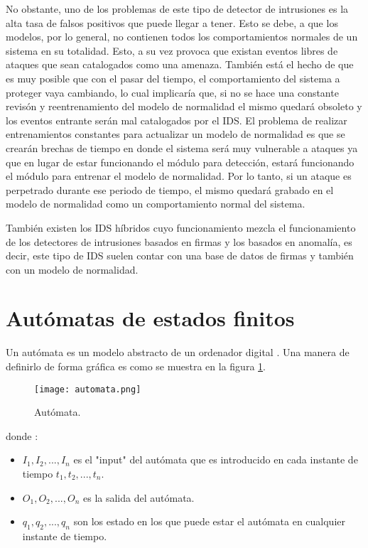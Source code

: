 No obstante, uno de los problemas de este tipo de detector de intrusiones es la alta tasa de falsos positivos que puede llegar a tener. Esto se debe, a que los modelos, por lo general, no contienen todos los comportamientos normales de un sistema en su totalidad. Esto, a su vez provoca que existan eventos libres de ataques que sean catalogados como una amenaza. Tambi\'en está el hecho de que es muy posible que con el pasar del tiempo, el comportamiento del sistema a proteger vaya cambiando, lo cual implicar\'ia que, si no se hace una constante revis\'on y reentrenamiento del modelo de normalidad el mismo quedar\'a obsoleto y los eventos entrante ser\'an mal catalogados por el IDS. El problema de realizar entrenamientos constantes para actualizar un modelo de normalidad es que se crearán brechas de tiempo en donde el sistema ser\'a muy vulnerable a ataques ya que en lugar de estar funcionando el módulo para detección, estar\'a funcionando el módulo para entrenar el modelo de normalidad. Por lo tanto, si un ataque es perpetrado durante ese periodo de tiempo, el mismo quedar\'a grabado en el modelo de normalidad como un comportamiento normal del sistema.

También existen los IDS híbridos cuyo funcionamiento mezcla el funcionamiento de los detectores de intrusiones basados en firmas y los basados en anomalía, es decir, este tipo de  IDS suelen contar con una base de datos de firmas y también con un modelo de normalidad.

\section{Autómatas de estados finitos}

Un autómata es un modelo abstracto de un ordenador digital \cite{automata}. Una manera de definirlo de forma gráfica es como se muestra en la figura \ref{fig:automata}.

\begin{figure}[tb]
\begin{center}
\texttt{[image: automata.png]}
\caption{Autómata.\cite{automata2}}
\label{fig:automata}
\end{center}
\end{figure}

donde \cite{automata2}:

\begin{itemize}
\item  $I_{1}, I_{2},..., I_{n}$ es el "input" del autómata  que es introducido en cada instante de tiempo $t_{1}, t_{2},..., t_{n}$.

\item $O_{1}, O_{2},..., O_{n}$ es la salida del autómata.

\item $q_{1}, q_{2},..., q_{n}$ son los estado en los que puede estar el autómata en cualquier instante de tiempo.
\end{itemize}

